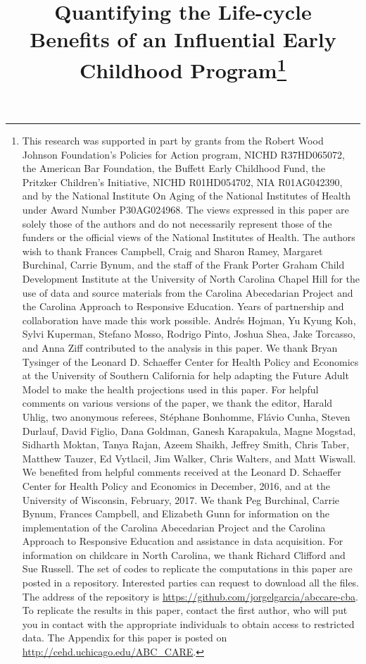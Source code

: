 \begin{titlepage}


\title{\Large \textbf{Quantifying the Life-cycle \\ Benefits of an Influential Early Childhood Program}\thanks{This research was supported in part by grants from the Robert Wood Johnson Foundation's Policies for Action program, NICHD R37HD065072, the American Bar Foundation, the Buffett Early Childhood Fund, the Pritzker Children's Initiative, NICHD R01HD054702, NIA R01AG042390, and by the National Institute On Aging of the National Institutes of Health under Award Number P30AG024968. The views expressed in this paper are solely those of the authors and do not necessarily represent those of the funders or the official views of the National Institutes of Health. The authors wish to thank Frances Campbell, Craig and Sharon Ramey, Margaret Burchinal, Carrie Bynum, and the staff of the Frank Porter Graham Child Development Institute at the University of North Carolina Chapel Hill for the use of data and source materials from the Carolina Abecedarian Project and the Carolina Approach to Responsive Education. Years of partnership and collaboration have made this work possible. Andr\'{e}s Hojman, Yu Kyung Koh, Sylvi Kuperman, Stefano Mosso, Rodrigo Pinto, Joshua Shea, Jake Torcasso, and Anna Ziff contributed to the analysis in this paper. We thank Bryan Tysinger of the Leonard D. Schaeffer Center for Health Policy and Economics at the University of Southern California for help adapting the Future Adult Model to make the health projections used in this paper. For helpful comments on various versions of the paper, we thank the editor, Harald Uhlig, two anonymous referees, St\'{e}phane Bonhomme, Fl\'{a}vio Cunha, Steven Durlauf, David Figlio, Dana Goldman, Ganesh Karapakula, Magne Mogstad, Sidharth Moktan, Tanya Rajan, Azeem Shaikh, Jeffrey Smith, Chris Taber, Matthew Tauzer, Ed Vytlacil, Jim Walker, Chris Walters, and Matt Wiswall. We benefited from helpful comments received at the Leonard D. Schaeffer Center for Health Policy and Economics in December, 2016, and at the University of Wisconsin, February, 2017. We thank Peg Burchinal, Carrie Bynum, Frances Campbell, and Elizabeth Gunn for information on the implementation of the Carolina Abecedarian Project and the Carolina Approach to Responsive Education and assistance in data acquisition. For information on childcare in North Carolina, we thank Richard Clifford and Sue Russell. The set of codes to replicate the computations in this paper are posted in a repository. Interested parties can request to download all the files. The address of the repository is \url{https://github.com/jorgelgarcia/abccare-cba}. To replicate the results in this paper, contact the first author, who will put you in contact with the appropriate individuals to obtain access to restricted data. The Appendix for this paper is posted on \url{http://cehd.uchicago.edu/ABC_CARE}.}}


\end{titlepage}
